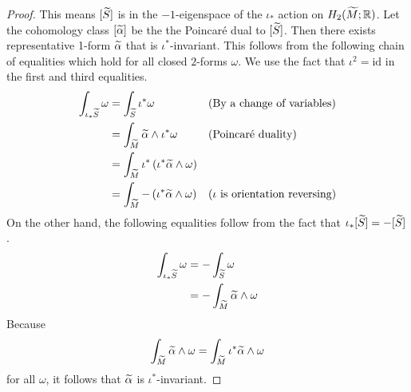 \begin{proof}
  This means $[\widetilde{S}]$ is in the $-1$-eigenspace of the $\iota_{\ast}$ action on $H_2(\widetilde{M}; \mathbb{R})$.
  Let the cohomology class $[\widetilde{\alpha}]$ be the the Poincar\'e dual to $[\widetilde{S}]$.
  Then there exists representative 1-form $\widetilde{\alpha}$ that is $\iota^{\ast}$-invariant.
  This follows from the following chain of equalities which hold for all closed $2$-forms $\omega$.
  We use the fact that $\iota^2= \mathrm{id}$ in the first and third equalities.
  \begin{align*}
    \int_{\iota_{\ast}\widetilde{S}} \omega &= \int_{\widetilde{S}} \iota^{\ast}\omega &&\text{(By a change of variables)} \\
                                     &= \int_{\widetilde{M}} \widetilde{\alpha} \wedge \iota^{\ast} \omega &&\text{(Poincar\'e duality)} \\
                                     &=\int_{\widetilde{M}} \iota^{\ast} \left( \iota^{\ast}\widetilde{\alpha} \wedge \omega \right) \\
    &= \int_{\widetilde{M}} - \left( \iota^{\ast} \widetilde{\alpha} \wedge \omega \right) &&\text{($\iota$ is orientation reversing)}
  \end{align*}
  On the other hand, the following equalities follow from the fact that $\iota_{\ast}[\widetilde{S}] = -[\widetilde{S}]$.
  \begin{align*}
    \int_{\iota_{\ast}\widetilde{S}} \omega &= - \int_{\widetilde{S}} \omega \\
                              &= - \int_{\widetilde{M}} \widetilde{\alpha} \wedge \omega
  \end{align*}
  Because $$\int_{\widetilde{M}}\widetilde{\alpha}\wedge\omega=\int_{\widetilde{M}}\iota^\ast\widetilde{\alpha}\wedge\omega$$ for all $\omega$, it follows that $\widetilde{\alpha}$ is
  $\iota^{\ast}$-invariant.
\end{proof}

